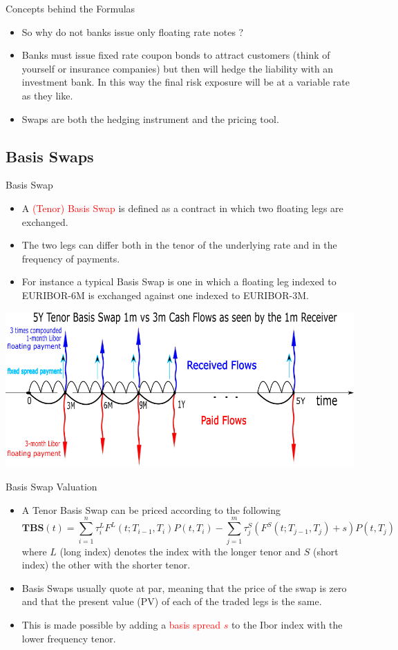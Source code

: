 \documentclass{beamer}
\begin{document}
\begin{frame}{Concepts behind the Formulas}
	\begin{itemize}
		\item<1-> So why do not banks issue only floating rate notes ?
		\item<2-> Banks must issue fixed rate coupon bonds to attract customers (think of yourself or insurance companies) but then will hedge the liability  with an investment bank. In this way the final risk exposure will be at a variable rate as they like. 
		\item<3-> Swaps are both the hedging instrument and the pricing tool.%
	\end{itemize}
\end{frame}

\subsection{Basis Swaps}
\begin{frame}{Basis Swap}
	\begin{itemize}
	\item A \textcolor{red}{(Tenor) Basis Swap} is defined as a contract in which two floating legs are exchanged.
	\item The two legs can differ both in the tenor of the underlying rate and in the frequency of payments.
	\item For instance a typical Basis Swap is one in which a floating leg indexed to EURIBOR-6M is exchanged against one indexed to EURIBOR-3M.
	\end{itemize}
	\begin{center}
		\includegraphics[width=0.5\linewidth]{tenor_basis_swap}
	\end{center}
\end{frame}

\begin{frame}{Basis Swap Valuation}
\begin{itemize}
	\item<1-> A Tenor Basis Swap can be priced according to the following
	\begin{equation}
	\textbf{TBS}(t) = \sum_{i=1}^n \tau_i^{L} F^{L}(t;T_{i-1},T_i)P(t,T_i) - \sum_{j=1}^m \tau_j^{S} (F^{S}(t;T_{j-1},T_j)+s)P(t,T_j)
	\end{equation}
	where $L$ (long index) denotes the index with the longer tenor and $S$ (short index) the other with the shorter tenor.
	\item<2-> Basis Swaps usually quote at par, meaning that the price of the swap is zero and that the present value (PV) of each of the traded legs is the same. 
	\item<3-> This is made possible by adding a \textcolor{red}{basis spread $s$} to the Ibor index with the lower frequency tenor.
	\end{itemize}
\end{frame}
\end{document}
